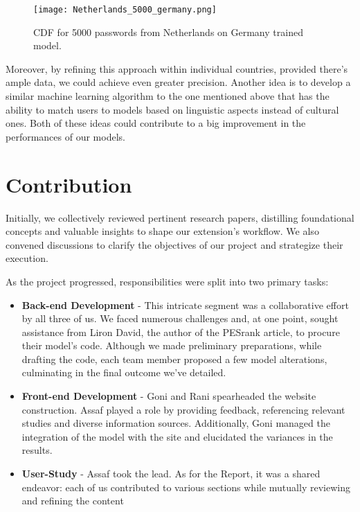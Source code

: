 \documentclass[5p,twocolumn]{elsarticle}
\begin{document}
 \begin{figure}[h]
\centering 
\texttt{[image: Netherlands\_5000\_germany.png]}
\caption{CDF for 5000 passwords from Netherlands on Germany trained model.}
\label{fig_mom0}%
\end{figure}

 Moreover, by refining this approach within individual countries, provided there's ample data, we could achieve even greater precision. Another idea is to develop a similar machine learning algorithm to the one mentioned above that has the ability to match users to models based on linguistic aspects instead of cultural ones. Both of these ideas could contribute to a big improvement in the performances of our models. 

\section{Contribution}
Initially, we collectively reviewed pertinent research papers, distilling foundational concepts and valuable insights to shape our extension's workflow. We also convened discussions to clarify the objectives of our project and strategize their execution.
 
As the project progressed, responsibilities were split into two primary tasks:
 
\begin{itemize}
    \item \textbf{Back-end Development} -  This intricate segment was a collaborative effort by all three of us. We faced numerous challenges and, at one point, sought assistance from Liron David, the author of the PESrank article, to procure their model's code. Although we made preliminary preparations, while drafting the code, each team member proposed a few model alterations, culminating in the final outcome we've detailed.
    \item \textbf{Front-end Development} - Goni and Rani spearheaded the website construction. Assaf played a role by providing feedback, referencing relevant studies and diverse information sources. Additionally, Goni managed the integration of the model with the site and elucidated the variances in the results.
    \item \textbf{User-Study} - Assaf took the lead. As for the Report, it was a shared endeavor: each of us contributed to various sections while mutually reviewing and refining the content
\end{itemize}
\end{document}
